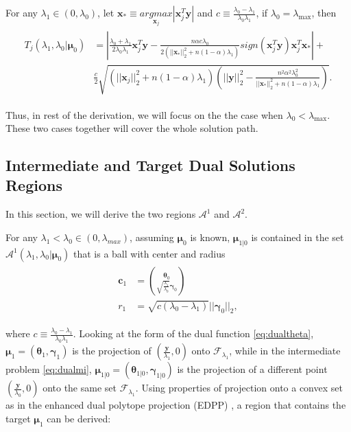 \begin{theorem}
    \label{thm:0.1}
    For any $\lambda_1\in(0,\lambda_{0})$, let $\boldsymbol x_*\equiv\underset{\boldsymbol x_j}{argmax}|\boldsymbol x_j^T\boldsymbol y|$ and $c\equiv \frac{\lambda_{0}-\lambda_1}{\lambda_{0}\lambda_1}$, if $\lambda_0=\lambda_{\max}$, then
    \begin{gather}
        \begin{aligned}
            T_j(\lambda_{1},\lambda_{0}|\boldsymbol\mu_0)&=\left|\frac{\lambda_{0}+\lambda_1}{2\lambda_{0}\lambda_1}\boldsymbol x_j^T\boldsymbol y-\frac{n\alpha c\lambda_{0}}{2(||\boldsymbol x_*||_2^2+n(1-\alpha)\lambda_1)}\textit{sign}(\boldsymbol x_j^T\boldsymbol y) \boldsymbol x_j^T\boldsymbol x_*\right|+\\
            &\frac{c}{2}\sqrt{\left(||\boldsymbol x_j||_2^2+n(1-\alpha)\lambda_1\right)\left(||\boldsymbol y||_2^2-\frac{n^2\alpha^2\lambda_{0}^2}{||\boldsymbol x_*||_2^2+n(1-\alpha)\lambda_1}\right)}.
        \end{aligned}
    \end{gather}
\end{theorem}
Thus, in rest of the derivation, we will focus on the the case when $\lambda_0<\lambda_{\max}$. These two cases together will cover the whole solution path.

\subsection{Intermediate and Target Dual Solutions Regions}

In this section, we will derive the two regions $\mathcal{A}^1$ and $\mathcal{A}^2$.

\begin{theorem}
    \label{thm:1.1}
    For any $\lambda_1<\lambda_{0}\in (0,\lambda_{max})$, assuming $\boldsymbol\mu_0$ is known, $\boldsymbol\mu_{1|0}$ is contained in the set $\mathcal{A}^1(\lambda_1,\lambda_0|\boldsymbol\mu_0)$ that is a ball with center and radius
    \begin{gather}
        \begin{aligned}
            \boldsymbol c_1&=\binom{\boldsymbol\theta_0}{\sqrt{\frac{\lambda_1}{\lambda_0}}\boldsymbol\gamma_0}\\
            r_1&=\sqrt{c(\lambda_0-\lambda_1)}||\boldsymbol\gamma_0||_2,
        \end{aligned}
    \end{gather}
\end{theorem}
where $c\equiv\frac{\lambda_0-\lambda_1}{\lambda_0\lambda_1}$. Looking at the form of the dual function \eqref{eq:dualtheta}, $\boldsymbol\mu_1=(\boldsymbol\theta_1,\boldsymbol\gamma_1)$ is the projection of $(\frac{\boldsymbol y}{\lambda_1},0)$ onto $\mathcal{F}_{\lambda_1}$, while in the intermediate problem \eqref{eq:dualmi}, $\boldsymbol\mu_{1|0}=(\boldsymbol\theta_{1|0},\boldsymbol\gamma_{1|0})$ is the projection of a different point $(\frac{\boldsymbol y}{\lambda_0},0)$ onto the same set $\mathcal{F}_{\lambda_1}$. Using properties of projection onto a convex set as in the enhanced dual polytope projection (EDPP) \citep{wang2013lasso}, a region that contains the target $\boldsymbol\mu_1$ can be derived:

